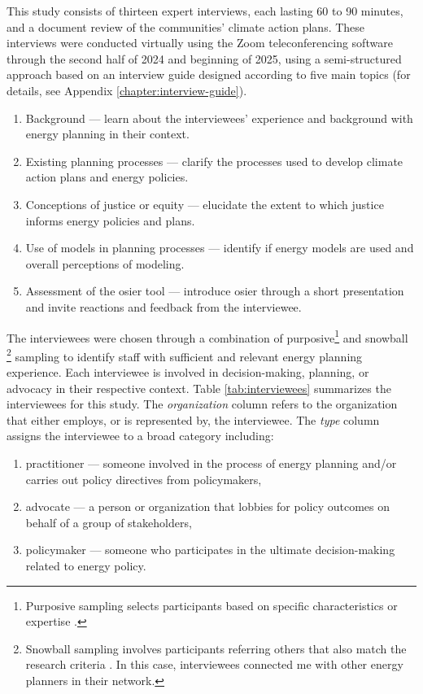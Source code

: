 This study consists of thirteen expert interviews, each lasting 60 to 90
minutes, and a document review of the communities' climate action plans. These
interviews were conducted virtually using the Zoom teleconferencing software
through the second half of 2024 and beginning of 2025, using a semi-structured
approach based on an interview guide designed according to five main topics (for
details, see Appendix \ref{chapter:interview-guide}).
\begin{enumerate}
    \item Background --- learn about the interviewees' experience and background
    with energy planning in their context.
    \item Existing planning processes --- clarify the processes used to develop
    climate action plans and energy policies.
    \item Conceptions of justice or equity --- elucidate the extent to which
    justice informs energy policies and plans.
    \item Use of models in planning processes --- identify if energy models are
    used and overall perceptions of modeling.
    \item Assessment of the \ac{osier} tool --- introduce \ac{osier} through a
    short presentation and invite reactions and feedback from the interviewee.
\end{enumerate}
The interviewees were chosen through a combination of
purposive\footnote{Purposive sampling selects participants based on specific
characteristics or expertise \cite{ahmed_how_2024}.} and snowball
\footnote{Snowball sampling involves participants referring others that also
match the research criteria \cite{ahmed_how_2024}. In this case, interviewees
connected me with other energy planners in their network.} sampling to identify
staff with sufficient and relevant energy planning experience. Each interviewee
is involved in decision-making, planning, or advocacy in their respective
context. Table \ref{tab:interviewees} summarizes the interviewees for this
study. The \textit{organization} column refers to the organization that either
employs, or is represented by, the interviewee. The \textit{type} column assigns
the interviewee to a broad category including:
\begin{enumerate}
    \item practitioner --- someone involved in the process of energy planning
    and/or carries out policy directives from policymakers,
    \item advocate --- a person or organization that lobbies for policy outcomes
    on behalf of a group of stakeholders,
    \item policymaker --- someone who participates in the ultimate
    decision-making related to energy policy.
\end{enumerate}
    
